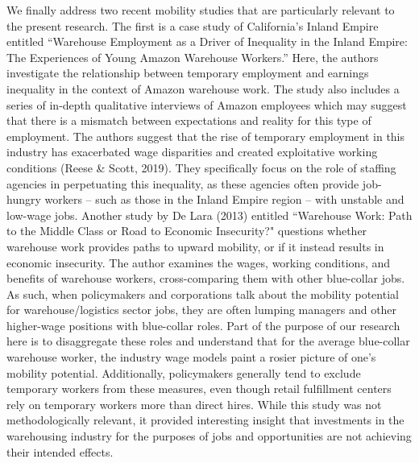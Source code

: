 \documentclass[11pt]{article}
\begin{document}
\begin{text}
\-\hspace{0.5cm} We finally address two recent mobility studies that are particularly relevant to the present research. The first is a case study of California's Inland Empire entitled “Warehouse Employment as a Driver of Inequality in the Inland Empire: The Experiences of Young Amazon Warehouse Workers.'' Here, the authors investigate the relationship between temporary employment and earnings inequality in the context of Amazon warehouse work. The study also includes a series of in-depth qualitative interviews of Amazon employees which may suggest that there is a mismatch between expectations and reality for this type of employment. The authors suggest that the rise of temporary employment in this industry has exacerbated wage disparities and created exploitative working conditions (Reese \& Scott, 2019). They specifically focus on the role of staffing agencies in perpetuating this inequality, as these agencies often provide job-hungry workers -- such as those in the Inland Empire region -- with unstable and low-wage jobs. Another study by De Lara (2013) entitled “Warehouse Work: Path to the Middle Class or Road to Economic Insecurity?" questions whether warehouse work provides paths to upward mobility, or if it instead results in economic insecurity. The author examines the wages, working conditions, and benefits of warehouse workers, cross-comparing them with other blue-collar jobs. As such, when policymakers and corporations talk about the mobility potential for warehouse/logistics sector jobs, they are often lumping managers and other higher-wage positions with blue-collar roles. Part of the purpose of our research here is to disaggregate these roles and understand that for the average blue-collar warehouse worker, the industry wage models paint a rosier picture of one's mobility potential. Additionally, policymakers generally tend to exclude temporary workers from these measures, even though retail fulfillment centers rely on temporary workers more than direct hires. While this study was not methodologically relevant, it provided interesting insight that investments in the warehousing industry for the purposes of jobs and opportunities are not achieving their intended effects.

\end{text}
\end{document}
